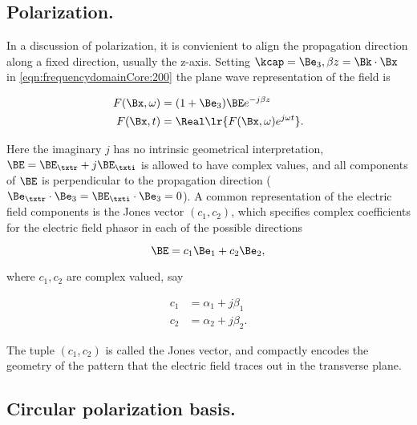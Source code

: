 %
%
\subsection{Polarization.}
In a discussion of polarization, it is convienient to align the propagation direction along a fixed direction, usually the z-axis.
Setting \( \kcap = \Be_3, \beta z = \Bk \cdot \Bx \) in \cref{eqn:frequencydomainCore:200} the plane wave representation of the field is

\begin{dmath}\label{eqn:polarization:20}
\begin{aligned}
F(\Bx, \omega) &= (1 + \Be_3) \BE e^{-j \beta z} \\
F(\Bx, t) &= \Real\lr{ F(\Bx, \omega) e^{j \omega t} }.
\end{aligned}
\end{dmath}

Here the imaginary \( j \) has no intrinsic geometrical interpretation, \( \BE = \BE_\txtr + j \BE_\txti \) is allowed to have complex values, and all components of \( \BE \) is perpendicular to the propagation direction (\( \Be_\txtr \cdot \Be_3 = \BE_\txti \cdot \Be_3 = 0 \)).
A common representation of the electric field components is the Jones vector \( (c_1, c_2) \), which specifies complex coefficients for the electric field phasor in each of the possible directions

\begin{dmath}\label{eqn:polarization:120}
\BE = c_1 \Be_1 + c_2 \Be_2,
\end{dmath}

where \( c_1, c_2 \) are complex valued, say

\begin{dmath}\label{eqn:polarization:140}
\begin{aligned}
c_1 &= \alpha_1 + j \beta_1 \\
c_2 &= \alpha_2 + j \beta_2.
\end{aligned}
\end{dmath}

The tuple \( (c_1, c_2) \) is called the Jones vector, and compactly encodes the geometry of the pattern that the electric field traces out in the transverse plane.

\subsection{Circular polarization basis.}

